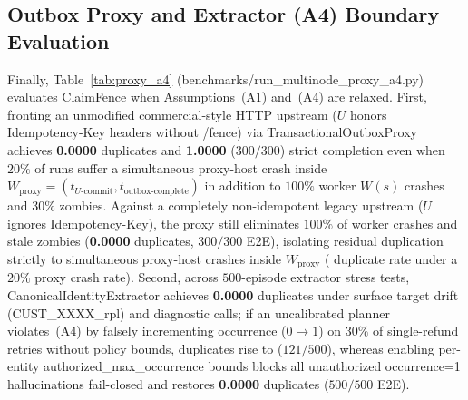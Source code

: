 \documentclass[10pt,journal]{IEEEtran}
\def\CF{ClaimFence}%
\def\texttt#1{#1}%
\theoremstyle{definition}
\theoremstyle{remark}
\newcommand{\CF}{\textsc{ClaimFence}}
\begin{document}
\subsection{Outbox Proxy and Extractor (A4) Boundary Evaluation}\label{sec:eval_proxy}
Finally, Table~\ref{tab:proxy_a4} (\texttt{benchmarks/\allowbreak run\_multinode\_\allowbreak proxy\_a4.py}) evaluates \CF{} when Assumptions~(A1) and~(A4) are relaxed. First, fronting an unmodified commercial-style HTTP upstream ($U$ honors \texttt{Idempotency-\allowbreak Key} headers without \texttt{/fence}) via \texttt{Transactional\allowbreak Outbox\allowbreak Proxy} achieves \textbf{0.0000} duplicates and \textbf{1.0000} ($300/300$) strict completion even when $20\%$ of runs suffer a simultaneous proxy-host crash inside $W_{\mathrm{proxy}} = (t_{U\text{-commit}}, t_{\mathrm{outbox\text{-}complete}})$ in addition to $100\%$ worker $W(s)$ crashes and $30\%$ zombies. Against a completely non-idempotent legacy upstream ($U$ ignores \texttt{Idempotency-\allowbreak Key}), the proxy still eliminates $100\%$ of worker crashes and stale zombies (\textbf{0.0000} duplicates, $300/300$ E2E), isolating residual duplication strictly to simultaneous proxy-host crashes inside $W_{\mathrm{proxy}}$ (\ProxyLegacyCrashDup{} duplicate rate under a $20\%$ proxy crash rate). Second, across $500$-episode extractor stress tests, \texttt{Canonical\allowbreak Identity\allowbreak Extractor} achieves \textbf{0.0000} duplicates under surface target drift (\texttt{CUST\_XXXX\_rpl}) and diagnostic calls; if an uncalibrated planner violates~(A4) by falsely incrementing \texttt{occurrence} ($0 \to 1$) on $30\%$ of single-refund retries without policy bounds, duplicates rise to \AFourUnguardedDup{} ($121/500$), whereas enabling per-entity \texttt{authorized\_\allowbreak max\_\allowbreak occurrence} bounds blocks all \AFourBlockedCnt{} unauthorized \texttt{occurrence=1} hallucinations fail-closed and restores \textbf{0.0000} duplicates ($500/500$ E2E).
\end{document}
